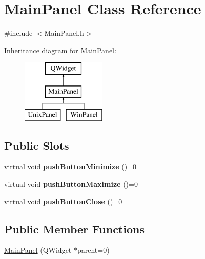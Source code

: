\hypertarget{class_main_panel}{}\section{Main\+Panel Class Reference}
\label{class_main_panel}


{\ttfamily \#include $<$Main\+Panel.\+h$>$}

Inheritance diagram for Main\+Panel\+:\begin{figure}[H]
\begin{center}
\leavevmode
\includegraphics[height=3.000000cm]{class_main_panel}
\end{center}
\end{figure}
\subsection*{Public Slots}
\begin{DoxyCompactItemize}
\item 
\hypertarget{class_main_panel_a5a9a0b381327e480b90ac01ce95f8006}{}virtual void {\bfseries push\+Button\+Minimize} ()=0\label{class_main_panel_a5a9a0b381327e480b90ac01ce95f8006}

\item 
\hypertarget{class_main_panel_aba28a15015874114feea84cfb7094c3e}{}virtual void {\bfseries push\+Button\+Maximize} ()=0\label{class_main_panel_aba28a15015874114feea84cfb7094c3e}

\item 
\hypertarget{class_main_panel_af0614a8cb6723ecdc1ec34353e1876f5}{}virtual void {\bfseries push\+Button\+Close} ()=0\label{class_main_panel_af0614a8cb6723ecdc1ec34353e1876f5}

\end{DoxyCompactItemize}
\subsection*{Public Member Functions}
\begin{DoxyCompactItemize}
\item 
\hyperlink{class_main_panel_a1f02146ae9ae2c7555ff6c1b89e1b954}{Main\+Panel} (Q\+Widget $\ast$parent=0)
\end{DoxyCompactItemize}
